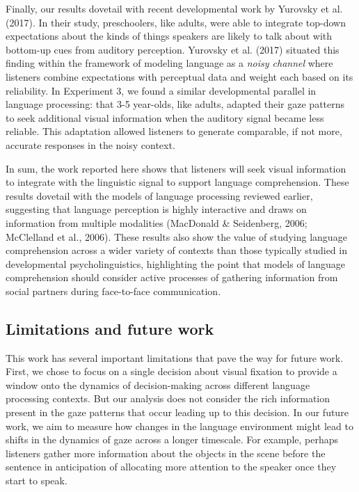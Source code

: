 \documentclass[english,floatsintext,man]{apa6}
\begin{document}
Finally, our results dovetail with recent developmental work by Yurovsky
et al. (2017). In their study, preschoolers, like adults, were able to
integrate top-down expectations about the kinds of things speakers are
likely to talk about with bottom-up cues from auditory perception.
Yurovsky et al. (2017) situated this finding within the framework of
modeling language as a \emph{noisy channel} where listeners combine
expectations with perceptual data and weight each based on its
reliability. In Experiment 3, we found a similar developmental parallel
in language processing: that 3-5 year-olds, like adults, adapted their
gaze patterns to seek additional visual information when the auditory
signal became less reliable. This adaptation allowed listeners to
generate comparable, if not more, accurate responses in the noisy
context.

In sum, the work reported here shows that listeners will seek visual
information to integrate with the linguistic signal to support language
comprehension. These results dovetail with the models of language
processing reviewed earlier, suggesting that language perception is
highly interactive and draws on information from multiple modalities
(MacDonald \& Seidenberg, 2006; McClelland et al., 2006). These results
also show the value of studying language comprehension across a wider
variety of contexts than those typically studied in developmental
psycholinguistics, highlighting the point that models of language
comprehension should consider active processes of gathering information
from social partners during face-to-face communication.

\hypertarget{limitations-and-future-work}{%
\subsection{Limitations and future
work}\label{limitations-and-future-work}}

This work has several important limitations that pave the way for future
work. First, we chose to focus on a single decision about visual
fixation to provide a window onto the dynamics of decision-making across
different language processing contexts. But our analysis does not
consider the rich information present in the gaze patterns that occur
leading up to this decision. In our future work, we aim to measure how
changes in the language environment might lead to shifts in the dynamics
of gaze across a longer timescale. For example, perhaps listeners gather
more information about the objects in the scene before the sentence in
anticipation of allocating more attention to the speaker once they start
to speak.
\end{document}
